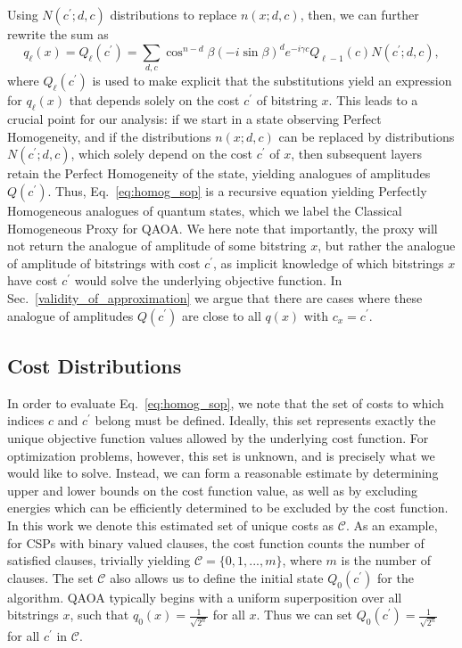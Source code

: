 \documentclass[superscriptaddress,pra,aps,10pt,longbibliography,notitlepage]{revtex4-1}
\newcommand*\cp{c^\prime}
\begin{document}
Using $N(\cp;d,c)$ distributions to replace $n(x;d,c)$, then, we can further rewrite the sum as
\begin{equation}\label{eq:homog_sop}
    q_{\ell}(x) = Q_{\ell}(\cp) = \sum_{d,c}  \cos^{n-d}\beta(-i\sin\beta)^d e^{-i\gamma c} Q_{\ell-1}(c) N(\cp;d,c),
\end{equation}
where $Q_{\ell}(\cp)$ is used to make explicit that the substitutions yield an expression for $q_{\ell}(x)$ that depends solely on the cost $\cp$ of bitstring $x$. This leads to a crucial point for our analysis: if we start in a state observing Perfect Homogeneity, and if the distributions $n(x;d,c)$ can be replaced by distributions $N(\cp;d,c)$, which solely depend on the cost $\cp$ of $x$, then subsequent layers retain the Perfect Homogeneity of the state, yielding analogues of amplitudes $Q(\cp)$. Thus, Eq.~\eqref{eq:homog_sop} is a recursive equation yielding Perfectly Homogeneous analogues of quantum states, which we label the Classical Homogeneous Proxy for QAOA. We here note that importantly, the proxy will not return the analogue of amplitude of some bitstring $x$, but rather the analogue of amplitude of bitstrings with cost $\cp$, as implicit knowledge of which bitstrings $x$ have cost $\cp$ would solve the underlying objective function. In Sec.~\ref{validity_of_approximation} we argue that there are cases where these analogue of amplitudes $Q(\cp)$ are close to all $q(x)$ with $c_x=\cp$. 

\subsection{Cost Distributions}\label{cost_distributions}

In order to evaluate Eq.~\eqref{eq:homog_sop}, we note that the set of costs to which indices $c$ and $\cp$ belong must be defined. Ideally, this set represents exactly the unique objective function values allowed by the underlying cost function. For optimization problems, however, this set is unknown, and is precisely what we would like to solve. Instead, we can form a reasonable estimate by determining upper and lower bounds on the cost function value, as well as by excluding energies which can be efficiently determined to be excluded by the cost function. In this work we denote this estimated set of unique costs as $\mathcal{C}$. As an example, for CSPs with binary valued clauses, the cost function counts the number of satisfied clauses, trivially yielding $\mathcal{C}=\{0,1,...,m\}$, where $m$ is the number of clauses. The set $\mathcal{C}$ also allows us to define the initial state $Q_0(\cp)$ for the algorithm. QAOA typically begins with a uniform superposition over all bitstrings $x$, such that $q_0(x) = \frac{1}{\sqrt{2^n}}$ for all $x$. Thus we can set $Q_0(\cp)=\frac{1}{\sqrt{2^n}}$ for all $\cp$ in $\mathcal{C}$.
\end{document}
